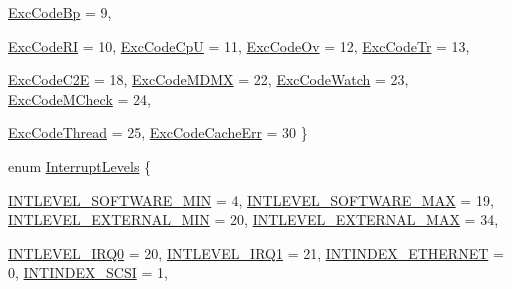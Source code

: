 \begin{DoxyCompactItemize}
\hyperlink{namespaceMipsISA_abcc8a7c57cd8becefbfd621dbff5ffd4a7b3697d781cd0db707834b2bb53bd827}{ExcCodeBp} =  9, 
\par
\hyperlink{namespaceMipsISA_abcc8a7c57cd8becefbfd621dbff5ffd4ac4e1012c7a50bac4f77659aa1d74f7b6}{ExcCodeRI} =  10, 
\hyperlink{namespaceMipsISA_abcc8a7c57cd8becefbfd621dbff5ffd4a551171a5da226246b5531b81b1b004d1}{ExcCodeCpU} =  11, 
\hyperlink{namespaceMipsISA_abcc8a7c57cd8becefbfd621dbff5ffd4a03cfe0fdb20fb915a732611a1fb1fcd6}{ExcCodeOv} =  12, 
\hyperlink{namespaceMipsISA_abcc8a7c57cd8becefbfd621dbff5ffd4a44790335bbdd6c0676c33451ea06cab8}{ExcCodeTr} =  13, 
\par
\hyperlink{namespaceMipsISA_abcc8a7c57cd8becefbfd621dbff5ffd4a58a6a6e65e3e3b00d734aad8a31f0494}{ExcCodeC2E} =  18, 
\hyperlink{namespaceMipsISA_abcc8a7c57cd8becefbfd621dbff5ffd4ae01827ff47490fa5c78b0db611874a8b}{ExcCodeMDMX} =  22, 
\hyperlink{namespaceMipsISA_abcc8a7c57cd8becefbfd621dbff5ffd4a4e56fc38462753d0857a59296f0adaee}{ExcCodeWatch} =  23, 
\hyperlink{namespaceMipsISA_abcc8a7c57cd8becefbfd621dbff5ffd4a7ad9e166669807776748fa26d5d0be13}{ExcCodeMCheck} =  24, 
\par
\hyperlink{namespaceMipsISA_abcc8a7c57cd8becefbfd621dbff5ffd4a023acb7f13ba7dbffe8164269a921f40}{ExcCodeThread} =  25, 
\hyperlink{namespaceMipsISA_abcc8a7c57cd8becefbfd621dbff5ffd4af2545e394c9e9232ba11ed2e4987c51c}{ExcCodeCacheErr} =  30
 \}
\item 
enum \hyperlink{namespaceMipsISA_aa201d1f9b8ac67b80bdf6c08f370558c}{InterruptLevels} \{ \par
\hyperlink{namespaceMipsISA_aa201d1f9b8ac67b80bdf6c08f370558ca8db7857d98d7e42b3e02bed7c3c540ba}{INTLEVEL\_\-SOFTWARE\_\-MIN} =  4, 
\hyperlink{namespaceMipsISA_aa201d1f9b8ac67b80bdf6c08f370558ca9918551eda4baa1f4e11aaf334bb894b}{INTLEVEL\_\-SOFTWARE\_\-MAX} =  19, 
\hyperlink{namespaceMipsISA_aa201d1f9b8ac67b80bdf6c08f370558cafc78264c66a1ac704f17daa5fa9f9260}{INTLEVEL\_\-EXTERNAL\_\-MIN} =  20, 
\hyperlink{namespaceMipsISA_aa201d1f9b8ac67b80bdf6c08f370558cae599256ab529cbe8194cbdde120144f5}{INTLEVEL\_\-EXTERNAL\_\-MAX} =  34, 
\par
\hyperlink{namespaceMipsISA_aa201d1f9b8ac67b80bdf6c08f370558cadce4ff34f9aaeca71ba8d90672214bec}{INTLEVEL\_\-IRQ0} =  20, 
\hyperlink{namespaceMipsISA_aa201d1f9b8ac67b80bdf6c08f370558cad864f4251825107a9b1858c1fbc868c5}{INTLEVEL\_\-IRQ1} =  21, 
\hyperlink{namespaceMipsISA_aa201d1f9b8ac67b80bdf6c08f370558ca0fed6fcec83dc8d0bd48f50010ad9d0d}{INTINDEX\_\-ETHERNET} =  0, 
\hyperlink{namespaceMipsISA_aa201d1f9b8ac67b80bdf6c08f370558ca34f32f6cdf764c379b096e418b18f9c3}{INTINDEX\_\-SCSI} =  1, 

\end{DoxyCompactItemize}
